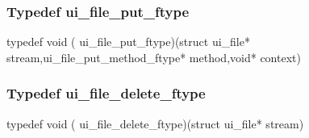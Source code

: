 \subsubsection{Typedef ui\_file\_put\_ftype}
\label{type_ui_file_put_ftype_ui-file.h}

{\stt typedef void ( ui\_file\_put\_ftype)(struct ui\_file* stream,ui\_file\_put\_method\_ftype* method,void* context)}


\subsubsection{Typedef ui\_file\_delete\_ftype}
\label{type_ui_file_delete_ftype_ui-file.h}

{\stt typedef void ( ui\_file\_delete\_ftype)(struct ui\_file* stream)}

